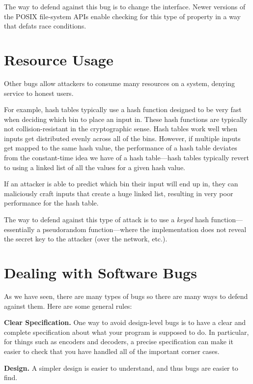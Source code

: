 \documentclass[
  letterpaper,
]{scrbook}
\theoremstyle{definition}
\theoremstyle{plain}
\theoremstyle{plain}
\theoremstyle{remark}
\begin{document}
The way to defend against this bug is to change the interface. Newer
versions of the POSIX file-system APIs enable checking for this type of
property in a way that defats race conditions.

\section{Resource Usage}\label{resource-usage}

Other bugs allow attackers to consume many resources on a system,
denying service to honest users.

For example, hash tables typically use a hash function designed to be
very fast when deciding which bin to place an input in. These hash
functions are typically not collision-resistant in the cryptographic
sense. Hash tables work well when inputs get distributed evenly across
all of the bins. However, if multiple inputs get mapped to the same hash
value, the performance of a hash table deviates from the constant-time
idea we have of a hash table---hash tables typically revert to using a
linked list of all the values for a given hash value.

If an attacker is able to predict which bin their input will end up in,
they can maliciously craft inputs that create a huge linked list,
resulting in very poor performance for the hash table.

The way to defend against this type of attack is to use a \emph{keyed}
hash function---essentially a pseudorandom function---where the
implementation does not reveal the secret key to the attacker (over the
network, etc.).

\section{Dealing with Software Bugs}\label{dealing-with-software-bugs}

As we have seen, there are many types of bugs so there are many ways to
defend against them. Here are some general rules:

\textbf{Clear Specification.} One way to avoid design-level bugs is to
have a clear and complete specification about what your program is
supposed to do. In particular, for things such as encoders and decoders,
a precise specification can make it easier to check that you have
handled all of the important corner cases.

\textbf{Design.} A simpler design is easier to understand, and thus bugs
are easier to find.
\end{document}

